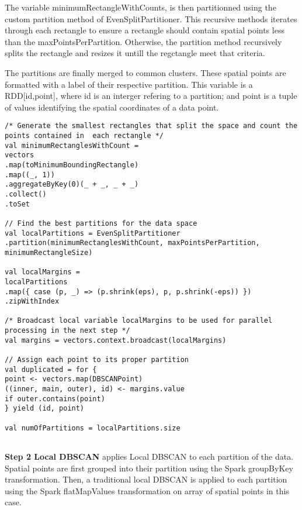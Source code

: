 The variable \textsf{minimumRectangleWithCounts}, is then partitionned using the custom  partition method of \textsf{EvenSplitPartitioner}. This recursive methods iterates through each rectangle to ensure a rectangle should contain spatial points less than the \textsf{maxPointsPerPartition}. Otherwise, the partition method recursively splits the rectangle and resizes it untill the regctangle meet that criteria.

The partitions are finally merged to common clusters. These spatial points are formatted  with a label of their respective partition. This variable is a \textsf{RDD[id,point]}, where \textsf{id} is an interger refering to a partition; and \textsf{point} is a tuple of values identifying the spatial coordinates of a data point. 

\begin{lstlisting}[style=myScalastyle,caption={ Data Partitionning in parellel DBSCAN},captionpos=b]
/* Generate the smallest rectangles that split the space and count the points contained in  each rectangle */
val minimumRectanglesWithCount =
vectors
.map(toMinimumBoundingRectangle)
.map((_, 1))
.aggregateByKey(0)(_ + _, _ + _)
.collect()
.toSet

// Find the best partitions for the data space 
val localPartitions = EvenSplitPartitioner
.partition(minimumRectanglesWithCount, maxPointsPerPartition, minimumRectangleSize)

val localMargins =
localPartitions
.map({ case (p, _) => (p.shrink(eps), p, p.shrink(-eps)) })
.zipWithIndex

/* Broadcast local variable localMargins to be used for parallel processing in the next step */
val margins = vectors.context.broadcast(localMargins)

// Assign each point to its proper partition
val duplicated = for {
point <- vectors.map(DBSCANPoint)
((inner, main, outer), id) <- margins.value
if outer.contains(point)
} yield (id, point)

val numOfPartitions = localPartitions.size


\end{lstlisting}


\textbf{Step 2 Local DBSCAN} applies Local DBSCAN to each partition of the data. Spatial points are first grouped into their partition using the Spark \textsf{groupByKey} transformation. Then, a traditional local DBSCAN is applied to each partition using the Spark \textsf{flatMapValues} transformation on array of spatial points in this case. 

